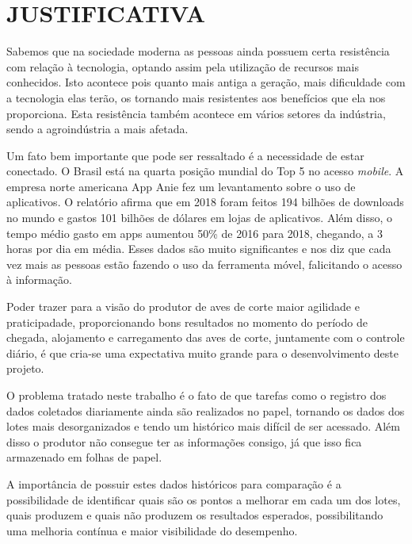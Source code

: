 
\chapter{JUSTIFICATIVA}
\label{chap:justificativa}

Sabemos que na sociedade moderna as pessoas ainda possuem certa resistência com relação à tecnologia, optando assim pela utilização de recursos mais conhecidos. Isto acontece pois quanto mais antiga a geração, mais dificuldade com a tecnologia elas terão, os tornando mais resistentes aos benefícios que ela nos proporciona. Esta resistência também acontece em vários setores da indústria, sendo a agroindústria a mais afetada. 

Um fato bem importante que pode ser ressaltado é a necessidade de estar conectado. O Brasil está na quarta posição mundial do Top 5 no acesso \textit{mobile}. A empresa norte americana App Anie fez um levantamento sobre o uso de aplicativos.
O relatório afirma que em 2018 foram feitos 194 bilhões de downloads no mundo e gastos 101 bilhões de dólares em lojas de aplicativos. Além disso, o tempo médio gasto em apps aumentou 50\% de 2016 para 2018, chegando, a 3 horas por dia em média. Esses dados são muito significantes e nos diz que cada vez mais as pessoas estão fazendo o uso da ferramenta móvel, falicitando o acesso à informação.

Poder trazer para a visão do produtor de aves de corte maior agilidade e praticipadade, proporcionando bons resultados no momento do período de chegada, alojamento e carregamento das aves de corte, juntamente com o controle diário, é que cria-se uma expectativa muito grande para o desenvolvimento deste projeto.

O problema tratado neste trabalho é o fato de que tarefas como o registro dos dados coletados diariamente ainda são realizados no papel, tornando os dados dos lotes mais desorganizados e tendo um histórico mais difícil de ser acessado. Além disso o produtor não consegue ter as informações consigo, já que isso fica armazenado em folhas de papel.

A importância de possuir estes dados históricos para comparação é a possibilidade de identificar quais são os pontos a melhorar em cada um dos lotes, quais produzem e quais não produzem os resultados esperados, possibilitando uma melhoria contínua e maior visibilidade do desempenho. 
